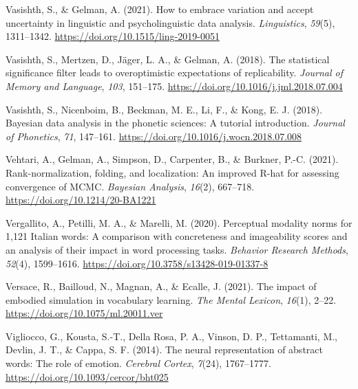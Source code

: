 \documentclass[
  12pt,
  man,floatsintext]{apa7}
\newlength{\cslhangindent}
\newlength{\cslentryspacingunit} %
\newenvironment{CSLReferences}[2] %
 {%
  \setlength{\parindent}{0pt}
  \ifodd #1
  \let\oldpar\par
  \def\par{\hangindent=\cslhangindent\oldpar}
  \fi
  \setlength{\parskip}{#2\cslentryspacingunit}
 }%
 {}
\begin{document}
\begin{CSLReferences}{1}{0}
\leavevmode{}%
Vasishth, S., \& Gelman, A. (2021). How to embrace variation and accept uncertainty in linguistic and psycholinguistic data analysis. \emph{Linguistics}, \emph{59}(5), 1311--1342. \url{https://doi.org/10.1515/ling-2019-0051}

\leavevmode{}%
Vasishth, S., Mertzen, D., Jäger, L. A., \& Gelman, A. (2018). The statistical significance filter leads to overoptimistic expectations of replicability. \emph{Journal of Memory and Language}, \emph{103}, 151--175. \url{https://doi.org/10.1016/j.jml.2018.07.004}

\leavevmode{}%
Vasishth, S., Nicenboim, B., Beckman, M. E., Li, F., \& Kong, E. J. (2018). Bayesian data analysis in the phonetic sciences: {A} tutorial introduction. \emph{Journal of Phonetics}, \emph{71}, 147--161. \url{https://doi.org/10.1016/j.wocn.2018.07.008}

\leavevmode{}%
Vehtari, A., Gelman, A., Simpson, D., Carpenter, B., \& Burkner, P.-C. (2021). Rank-normalization, folding, and localization: {An} improved {R-hat} for assessing convergence of {MCMC}. \emph{Bayesian Analysis}, \emph{16}(2), 667--718. \url{https://doi.org/10.1214/20-BA1221}

\leavevmode{}%
Vergallito, A., Petilli, M. A., \& Marelli, M. (2020). Perceptual modality norms for 1,121 {Italian} words: {A} comparison with concreteness and imageability scores and an analysis of their impact in word processing tasks. \emph{Behavior Research Methods}, \emph{52}(4), 1599--1616. \url{https://doi.org/10.3758/s13428-019-01337-8}

\leavevmode{}%
Versace, R., Bailloud, N., Magnan, A., \& Ecalle, J. (2021). The impact of embodied simulation in vocabulary learning. \emph{The Mental Lexicon}, \emph{16}(1), 2--22. \url{https://doi.org/10.1075/ml.20011.ver}

\leavevmode{}%
Vigliocco, G., Kousta, S.-T., Della Rosa, P. A., Vinson, D. P., Tettamanti, M., Devlin, J. T., \& Cappa, S. F. (2014). The neural representation of abstract words: The role of emotion. \emph{Cerebral Cortex}, \emph{7}(24), 1767--1777. \url{https://doi.org/10.1093/cercor/bht025}


\end{CSLReferences}
\end{document}
